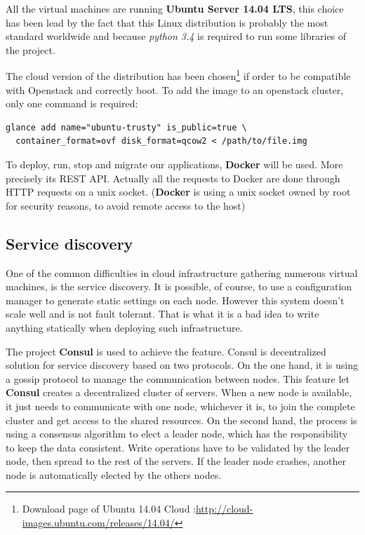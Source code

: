 All the virtual machines are running \textbf{Ubuntu Server 14.04 LTS}, this
choice has been lead by the fact that this Linux distribution is probably the
most standard worldwide and because \textit{python 3.4} is required to run some
libraries of the project.

The cloud version of the distribution has been chosen\footnote{Download page of
Ubuntu 14.04 Cloud :\url{http://cloud-images.ubuntu.com/releases/14.04/}} if
order to be compatible with Openstack and correctly boot. To add the image to
an openstack cluster, only one command is required:

\vspace{1em}
\begin{lstlisting}
glance add name="ubuntu-trusty" is_public=true \ 
  container_format=ovf disk_format=qcow2 < /path/to/file.img
\end{lstlisting}

To deploy, run, stop and migrate our applications, \textbf{Docker} will be
used. More precisely its REST API. Actually all the requests to Docker are done
through HTTP requests on a unix socket. (\textbf{Docker} is using a unix socket
owned by root for security reasons, to avoid remote access to the host)

\subsection{Service discovery}

One of the common difficulties in cloud infrastructure gathering numerous
virtual machines, is the service discovery. It is possible, of course, to use a
configuration manager to generate static settings on each node.  However this
system doesn't scale well and is not fault tolerant. That is what it is a bad
idea to write anything statically when deploying such infrastructure.

The project \textbf{Consul} is used to achieve the feature. Consul is
decentralized solution for service discovery based on two protocols. On the one
hand, it is using a gossip protocol to manage the communication between nodes.
This feature let \textbf{Consul} creates a decentralized cluster of servers.
When a new node is available, it just needs to communicate with one node,
whichever it is, to join the complete cluster and get access to the shared
resources. On the second hand, the process is using a consensus algorithm to
elect a leader node, which has the responsibility to keep the
data consistent. Write operations have to be validated by the leader node, then
spread to the rest of the servers. If the leader node crashes, another node is
automatically elected by the others nodes.

